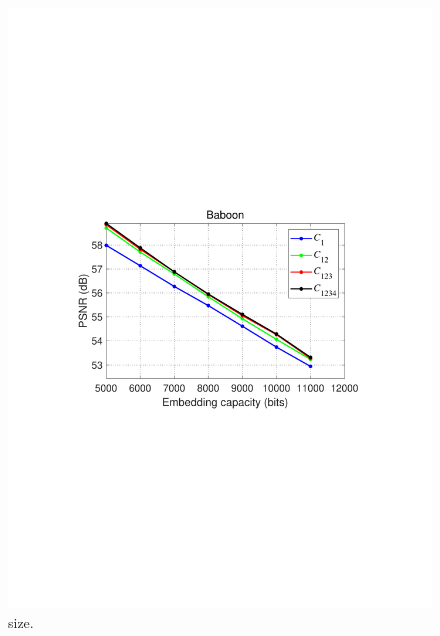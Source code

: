 \documentclass[review,3p,10pt,sort&compress]{elsarticle}
\begin{document}
\begin{figure}
{\begin{minipage}[t]{0.412\linewidth}
\includegraphics[width=1\textwidth]{figures/Result/size/Baboon.pdf}
\end{minipage}
}
\centering
\caption{size.}
\label{fig:size}       %
\end{figure}
\end{document}
